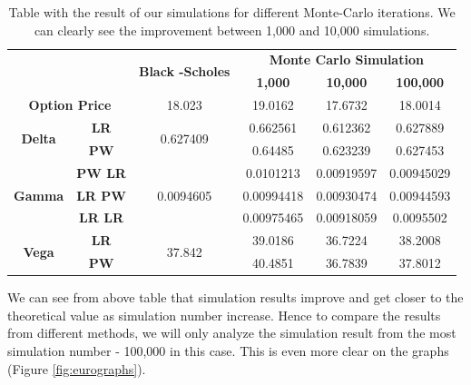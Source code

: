 \documentclass[11pt,a4paper,fleqn]{article}
\begin{document}
\begin{table}[h!]
\centering
\begin{tabular}{|c|c|c|c|c|c|}
\hline
\multicolumn{2}{|c|}{\multirow{2}{*}{}}          & \multirow{2}{*}{\textbf{Black -Scholes}} & \multicolumn{3}{c|}{\textbf{Monte Carlo Simulation}} \\ \cline{4-6}
\multicolumn{2}{|c|}{}                           &                                          & \textbf{1,000}  & \textbf{10,000} & \textbf{100,000} \\ \hline
\multicolumn{2}{|c|}{\textbf{Option Price}}      & 18.023                                   & 19.0162         & 17.6732         & 18.0014          \\ \hline
\multirow{2}{*}{\textbf{Delta}} & \textbf{LR}    & \multirow{2}{*}{0.627409}                & 0.662561        & 0.612362        & 0.627889         \\ \cline{2-2} \cline{4-6}
                                & \textbf{PW}    &                                          & 0.64485         & 0.623239        & 0.627453         \\ \hline
\multirow{3}{*}{\textbf{Gamma}} & \textbf{PW LR} & \multirow{3}{*}{0.0094605}               & 0.0101213       & 0.00919597      & 0.00945029       \\ \cline{2-2} \cline{4-6}
                                & \textbf{LR PW} &                                          & 0.00994418      & 0.00930474      & 0.00944593       \\ \cline{2-2} \cline{4-6}
                                & \textbf{LR LR} &                                          & 0.00975465      & 0.00918059      & 0.0095502        \\ \hline
\multirow{2}{*}{\textbf{Vega}}  & \textbf{LR}    & \multirow{2}{*}{37.842}                  & 39.0186         & 36.7224         & 38.2008          \\ \cline{2-2} \cline{4-6}
                                & \textbf{PW}    &                                          & 40.4851         & 36.7839         & 37.8012          \\ \hline
\end{tabular}
\caption{\label{tab:euroresults}Table with the result of our simulations for different Monte-Carlo iterations. We can clearly see the improvement between 1,000 and 10,000 simulations.}
\end{table}

We can see from above table that simulation results improve and get closer to the theoretical value as simulation number increase. Hence to compare the results from different methods, we will only analyze the simulation result from the most simulation number - 100,000 in this case. This is even more clear on the graphs (Figure \ref{fig:eurographs}).
\end{document}
